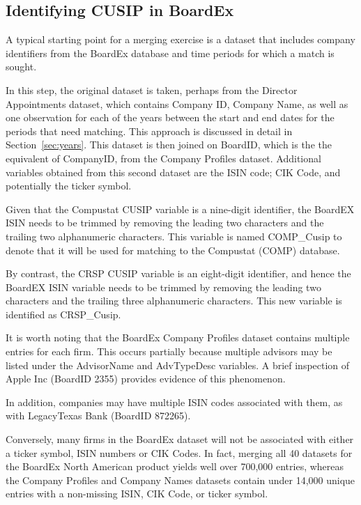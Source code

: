 \documentclass[12pt]{article}
\begin{document}
\subsection{Identifying CUSIP in BoardEx}\label{sec:BECUSIP}

A typical starting point for a merging exercise is a dataset that includes company identifiers from the BoardEx database and time periods for which a match is sought.

In this step, the original dataset is taken, perhaps from the Director Appointments dataset, which contains Company ID, Company Name, as well as one observation for each of the years between the start and end dates for the periods that need matching.
This approach is discussed in detail in Section~\ref{sec:years}.
This dataset is then joined on BoardID, which is the the equivalent of CompanyID, from the Company Profiles dataset.
Additional variables obtained from this second dataset are the ISIN code; CIK Code, and potentially the ticker symbol.

Given that the Compustat CUSIP variable is a nine-digit identifier, the BoardEX ISIN needs to be trimmed by removing the leading two characters and the trailing two alphanumeric characters.
This variable is named COMP\_Cusip to denote that it will be used for matching to the Compustat (COMP) database.

By contrast, the CRSP CUSIP variable is an eight-digit identifier, and hence the BoardEX ISIN variable needs to be trimmed by removing the leading two characters and the trailing three alphanumeric characters.
This new variable is identified as CRSP\_Cusip.

It is worth noting that the BoardEx Company Profiles dataset contains multiple entries for each firm.
This occurs partially because multiple advisors may be listed under the AdvisorName and AdvTypeDesc variables.
A brief inspection of Apple Inc (BoardID 2355) provides evidence of this phenomenon.

\begin{center}

\end{center}

In addition, companies may have multiple ISIN codes associated with them, as with LegacyTexas Bank (BoardID 872265).

\begin{center}

\end{center}

Conversely, many firms in the BoardEx dataset will not be associated with either a ticker symbol, ISIN numbers or CIK Codes.
In fact, merging all 40 datasets for the BoardEx North American product yields well over 700,000 entries, whereas the Company Profiles and Company Names datasets contain under 14,000 unique entries with a non-missing ISIN, CIK Code, or ticker symbol.
\end{document}
